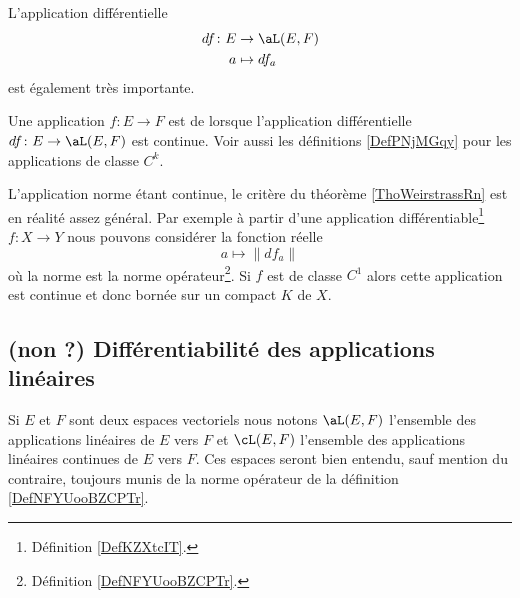 L'application différentielle
\begin{equation}
    \begin{aligned}
        df\colon E&\to \aL(E,F) \\
        a&\mapsto df_a 
    \end{aligned}
\end{equation}
est également très importante. 

\begin{definition}      \label{DefJYBZooPTsfZx}
Une application \( f\colon E\to F\) est de  lorsque l'application différentielle \( df\colon E\to \aL(E,F)\) est continue. Voir aussi les définitions \ref{DefPNjMGqy} pour les applications de classe \( C^k\).
\end{definition}

\begin{remark}      \label{RemATQVooDnZBbs}
    L'application norme étant continue, le critère du théorème \ref{ThoWeirstrassRn} est en réalité assez général. Par exemple à partir d'une application différentiable\footnote{Définition \ref{DefKZXtcIT}.} \( f\colon X\to Y\)  nous pouvons considérer la fonction réelle
    \begin{equation}
        a\mapsto \|  df_a   \|
    \end{equation}
    où la norme est la norme opérateur\footnote{Définition \ref{DefNFYUooBZCPTr}.}. Si \( f\) est de classe \( C^1\) alors cette application est continue et donc bornée sur un compact \( K\) de \( X\).
\end{remark}

\subsection{(non ?) Différentiabilité des applications linéaires}

Si \( E\) et \( F\) sont deux espaces vectoriels nous notons \( \aL(E,F)\) l'ensemble des applications linéaires de \( E\) vers \( F\) et \( \cL(E,F)\) l'ensemble des applications linéaires continues de \( E\) vers \( F\). Ces espaces seront bien entendu, sauf mention du contraire, toujours munis de la norme opérateur de la définition \ref{DefNFYUooBZCPTr}. 


